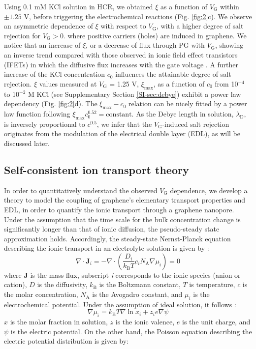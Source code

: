 \documentclass[journal=langd5,email=true, hyperref=true, keywords=false]{achemso}
\newcommand{\Fig}{Fig.}
\begin{document}
Using 0.1 mM KCl solution in HCR, we obtained $\xi$ as a function of
$V_{\mathrm{G}}$ within $\pm1.25$ V, before triggering the
electrochemical reactions (\Fig{} \ref{fig:2}c). We observe an
asymmetric dependence of $\xi$ with respect to $V_{\mathrm{G}}$, with
a higher degree of salt rejection for $V_{\mathrm{G}}>0$. where
positive carriers (holes) are induced in graphene. We notice that an
increase of $\xi$, or a decrease of flux through PG with
$V_{\mathrm{G}}$, showing an inverse trend compared with those
observed in ionic field effect transistors (IFETs) in which the
diffusive flux increases with the gate voltage
\cite{Nam_2009,Cheng_2018}. A further increase of the KCl
concentration $c_{0}$ influences the attainable degree of salt
rejection. $\xi$ values measured at $V_{\mathrm{G}}$ = 1.25 V,
$\xi_{\mathrm{max}}$, as a function of $c_{0}$ from 10$^{-4}$ to
10$^{-2}$ M KCl (see Supplementary Section \ref{SI-sec:debye}) exhibit
a power law dependency (\Fig{} \ref{fig:2}d). The
$\xi_{\mathrm{max}}-c_{0}$ relation can be nicely fitted by a power
law function following
$\xi_{\mathrm{max}} c_{0}^{0.52} = \mathrm{constant}$. As the Debye
length in solution, $\lambda_{\mathrm{D}}$, is inversely proportional
to $c^{0.5}$, we infer that the $V_{\mathrm{G}}$-induced salt
rejection originates from the modulation of the electrical double
layer (EDL), as will be discussed later.

\subsection{Self-consistent ion transport theory}
\label{sec:theory}

In order to quantitatively understand the observed $V_{\mathrm{G}}$
dependence, we develop a theory to model the coupling of graphene's
elementary transport properties and EDL, in order to quantify the
ionic transport through a graphene nanopore. Under the assumption that
the time scale for the bulk concentration change is significantly
longer than that of ionic diffusion, the pseudo-steady state
approximation holds. Accordingly, the steady-state Nernst-Planck
equation describing the ionic transport in an electrolyte solution is
given by \cite{MacGillivray_1968}:
\begin{equation}
  \label{eq:pnp}
  \nabla \cdot \boldsymbol{J}_{i} = -\nabla \cdot (\frac{D_{i}}{k_{\mathrm{B}}T} c_{i} N_{\mathrm{A}} \nabla \mu_{i}) = 0
\end{equation}
where $\boldsymbol{J}$ is the mass flux, subscript \textit{i}
corresponds to the ionic species (anion or cation), $D$ is the diffusivity,
$k_{\mathrm{B}}$ is the Boltzmann constant, $T$ is temperature, $c$ is
the molar concentration, $N_{\mathrm{A}}$ is the Avogadro constant,
and $\mu_{i}$ is the electrochemical potential. Under the assumption
of ideal solution, it follows \cite{Kilic_2007}:
\begin{equation}
  \label{eq:mu}
  \nabla \mu_{i} = k_{\mathrm{B}} T \nabla \ln x_{i} + z_{i} e \nabla \psi
\end{equation}
 $x$ is the molar fraction in solution, $z$ is the ionic valence,
$e$ is the unit charge, and $\psi$ is the electric potential. On the
other hand, the Poisson equation describing the electric potential
distribution is given by:
\end{document}
